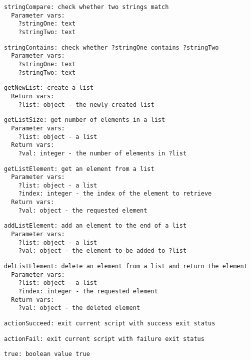 \documentclass[11pt,letterpaper]{article}
\begin{document}
\begin{Verbatim}
stringCompare: check whether two strings match
  Parameter vars:
    ?stringOne: text
    ?stringTwo: text
\end{Verbatim}

\begin{Verbatim}
stringContains: check whether ?stringOne contains ?stringTwo
  Parameter vars:
    ?stringOne: text
    ?stringTwo: text
\end{Verbatim}

\begin{Verbatim}
getNewList: create a list
  Return vars:
    ?list: object - the newly-created list
\end{Verbatim}

\begin{Verbatim}
getListSize: get number of elements in a list
  Parameter vars:
    ?list: object - a list
  Return vars:
    ?val: integer - the number of elements in ?list
\end{Verbatim}

\begin{Verbatim}
getListElement: get an element from a list
  Parameter vars:
    ?list: object - a list
    ?index: integer - the index of the element to retrieve
  Return vars:
    ?val: object - the requested element
\end{Verbatim}

\begin{Verbatim}
addListElement: add an element to the end of a list
  Parameter vars:
    ?list: object - a list
    ?val: object - the element to be added to ?list
\end{Verbatim}

\begin{Verbatim}
delListElement: delete an element from a list and return the element
  Parameter vars:
    ?list: object - a list
    ?index: integer - the requested element
  Return vars:
    ?val: object - the deleted element
\end{Verbatim}

\begin{Verbatim}
actionSucceed: exit current script with success exit status
\end{Verbatim}

\begin{Verbatim}
actionFail: exit current script with failure exit status
\end{Verbatim}

\begin{Verbatim}
true: boolean value true
\end{Verbatim}
\end{document}
